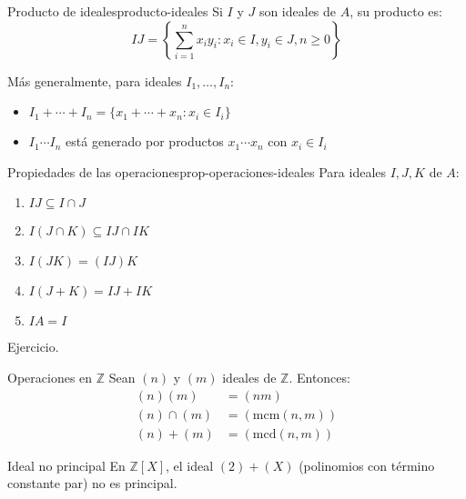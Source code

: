 \begin{definition}{Producto de ideales}{producto-ideales}
    Si \(I\) y \(J\) son ideales de \(A\), su {producto} es:
    \[
    IJ = \left\{\sum_{i=1}^n x_i y_i : x_i \in I, y_i \in J, n \geq 0\right\}
    \]
\end{definition}

\begin{remark}
    Más generalmente, para ideales \(I_1, \ldots, I_n\):
    \begin{itemize}
        \item \(I_1 + \cdots + I_n = \{x_1 + \cdots + x_n : x_i \in I_i\}\)
        \item \(I_1 \cdots I_n\) está generado por productos \(x_1 \cdots x_n\) con \(x_i \in I_i\)
    \end{itemize}
\end{remark}

\begin{proposition}{Propiedades de las operaciones}{prop-operaciones-ideales}
    Para ideales \(I, J, K\) de \(A\):
    \begin{enumerate}
        \item \(IJ \subseteq I \cap J\)
        \item \(I(J \cap K) \subseteq IJ \cap IK\)
        \item \(I(JK) = (IJ)K\)
        \item \(I(J + K) = IJ + IK\)
        \item \(IA = I\)
    \end{enumerate}
\end{proposition}

\begin{proofbox}
    Ejercicio.
\end{proofbox}

\begin{example}{Operaciones en \(\mathbb{Z}\)}{}
    Sean \((n)\) y \((m)\) ideales de \(\mathbb{Z}\). Entonces:
    \begin{align*}
        (n)(m) &= (nm) \\
        (n) \cap (m) &= (\mathrm{mcm}(n, m)) \\
        (n) + (m) &= (\mathrm{mcd}(n, m))
    \end{align*}
\end{example}

\begin{example}{Ideal no principal}{}
    En \(\mathbb{Z}[X]\), el ideal \((2) + (X)\) (polinomios con término constante par) no es principal.
\end{example}

